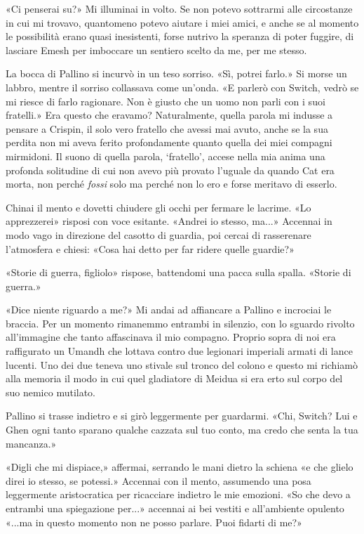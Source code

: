 «Ci penserai su?» Mi illuminai in volto. Se non potevo sottrarmi alle
circostanze in cui mi trovavo, quantomeno potevo aiutare i miei amici, e
anche se al momento le possibilità erano quasi inesistenti, forse
nutrivo la speranza di poter fuggire, di lasciare Emesh per imboccare un
sentiero scelto da me, per me stesso.

La bocca di Pallino si incurvò in un teso sorriso. «Sì, potrei farlo.»
Si morse un labbro, mentre il sorriso collassava come un'onda. «E
parlerò con Switch, vedrò se mi riesce di farlo ragionare. Non è giusto
che un uomo non parli con i suoi fratelli.» Era questo che eravamo?
Naturalmente, quella parola mi indusse a pensare a Crispin, il solo vero
fratello che avessi mai avuto, anche se la sua perdita non mi aveva
ferito profondamente quanto quella dei miei compagni mirmidoni. Il suono
di quella parola, `fratello', accese nella mia anima una profonda
solitudine di cui non avevo più provato l'uguale da quando Cat era
morta, non perché \emph{fossi} solo ma perché non lo ero e forse
meritavo di esserlo.

Chinai il mento e dovetti chiudere gli occhi per fermare le lacrime. «Lo
apprezzerei» risposi con voce esitante. «Andrei io stesso, ma...»
Accennai in modo vago in direzione del casotto di guardia, poi cercai di
rasserenare l'atmosfera e chiesi: «Cosa hai detto per far ridere quelle
guardie?»

«Storie di guerra, figliolo» rispose, battendomi una pacca sulla spalla.
«Storie di guerra.»

«Dice niente riguardo a me?» Mi andai ad affiancare a Pallino e
incrociai le braccia. Per un momento rimanemmo entrambi in silenzio, con
lo sguardo rivolto all'immagine che tanto affascinava il mio compagno.
Proprio sopra di noi era raffigurato un Umandh che lottava contro due
legionari imperiali armati di lance lucenti. Uno dei due teneva uno
stivale sul tronco del colono e questo mi richiamò alla memoria il modo
in cui quel gladiatore di Meidua si era erto sul corpo del suo nemico
mutilato.

Pallino si trasse indietro e si girò leggermente per guardarmi. «Chi,
Switch? Lui e Ghen ogni tanto sparano qualche cazzata sul tuo conto, ma
credo che senta la tua mancanza.»

«Digli che mi dispiace,» affermai, serrando le mani dietro la schiena «e
che glielo direi io stesso, se potessi.» Accennai con il mento,
assumendo una posa leggermente aristocratica per ricacciare indietro le
mie emozioni. «So che devo a entrambi una spiegazione per...» accennai
ai bei vestiti e all'ambiente opulento «...ma in questo momento non ne
posso parlare. Puoi fidarti di me?»

